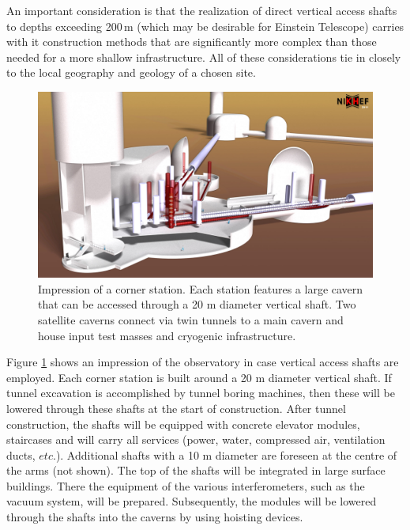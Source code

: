 An important consideration is that the realization of direct vertical access shafts to depths exceeding 200\,m (which may be desirable for Einstein Telescope) carries with it construction methods that are significantly more complex than those needed for a more shallow infrastructure. All of these considerations tie in closely to the local geography and geology of a chosen site.
\begin{figure}[htbp!]
	\centering
		\includegraphics[width=17cm]{./Sec_SiteInfra/Figures/ShaftAccess.jpg}
		\caption{Impression of a corner station. Each station features a large cavern that can be accessed through a 20 m diameter vertical shaft. Two satellite caverns connect via twin tunnels to a main cavern and house input test masses and cryogenic infrastructure.}
	\label{shaftaccess}
\end{figure}

Figure \ref{shaftaccess} shows an impression of the observatory in case vertical access shafts are employed. Each corner station is built around a 20 m diameter vertical shaft. If tunnel excavation is accomplished by tunnel boring machines, then these will be lowered through these shafts at the start of construction. After tunnel construction, the shafts will be equipped with concrete elevator modules, staircases and will carry all services (power, water, compressed air, ventilation ducts, $etc.$). Additional shafts with a 10 m diameter are foreseen at the centre of the arms (not shown). The top of the shafts will be integrated in large surface buildings. There the equipment of the various interferometers, such as the vacuum system, will be prepared. Subsequently, the modules will be lowered through the shafts into the caverns by using hoisting devices.

